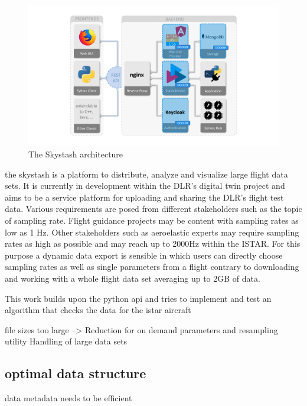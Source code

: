 \begin{figure}[h]
    \centering
    \includegraphics[width=\textwidth]{03_figures/stash_architecture}
    \caption{The Skystash architecture \cite{arts_digital_nodate}}
    \label{fig:stash_architecture}
\end{figure}

the skystash is a platform to distribute, analyze and visualize large flight data sets. It is currently in development within the DLR's digital twin project and aims to be a service platform for uploading and sharing the DLR's flight test data. Various requirements are posed from different stakeholders such as the topic of sampling rate. Flight guidance projects may be content with sampling rates as low as 1 Hz. Other stakeholders such as aeroelastic experts may require sampling rates as high as possible and may reach up to 2000Hz within the ISTAR. For this purpose a dynamic data export is sensible in which users can directly choose sampling rates as well as single parameters from a flight contrary to downloading and working with a whole flight data set averaging up to 2GB of data.

This work builds upon the python api and tries to implement and test an algorithm that checks the data for the istar aircraft


file sizes too large --> Reduction for on demand parameters and resampling utility
Handling of large data sets

\subsection{optimal data structure}
data
metadata
needs to be efficient

